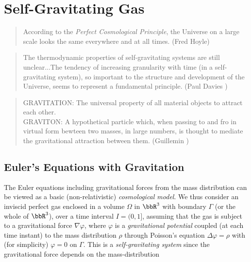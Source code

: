 \chapter{Self-Gravitating Gas}\label{ch:cosmology}

\small
\begin{quote} According to the \emph{Perfect Cosmological Principle}, 
the Universe on a large scale looks the same everywhere and at all times.
(Fred Hoyle)
\end{quote}
\begin{quote} The thermodynamic properties of self-gravitating
systems are still unclear...The tendency of increasing granularity with time
(in a self-gravitating system), so important to the structure and development 
of the Universe, seems to represent a fundamental principle. 
(Paul Davies \cite{davies})
\end{quote}
\begin{quote} 
GRAVITATION: The universal property of all material objects
to attract each other.\\
GRAVITON: A hypothetical particle which, when passing
to and fro in virtual form bewteen two masses, in large numbers,
is thought to mediate the gravitational attraction between them.
(Guillemin \cite{guillemin})
\end{quote}
\normalsize

\normalsize

\section{Euler's Equations with Gravitation}

The Euler equations including gravitational forces from the mass distribution
can be viewed as a basic (non-relativistic) \emph{cosmological model}.  
We thus consider an inviscid perfect gas 
enclosed in a volume $\Omega$ in $\bbR^3$ with boundary $\Gamma$
(or the whole of $\bbR^3$), over a time interval $I=(0,1]$, assuming 
that the gas is subject to a gravitational force $\nabla\varphi$, where
$\varphi$ is a \emph{gravitational potential} 
coupled (at each time instant) to the mass distribution $\rho$  
through Poisson's equation $\Delta\varphi =\rho$
with (for simplicity) $\varphi =0$ on $\Gamma$. This is a 
\emph{self-gravitating system} since the gravitational force depends
on the mass-distribution  

